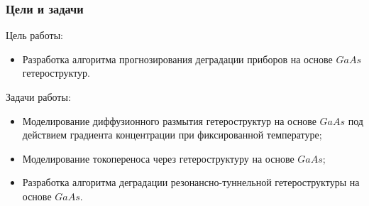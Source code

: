 \documentclass[10pt,pdf,hyperref={unicode},aspectratio={169}]{beamer}
\begin{document}
\begin{frame}
	\frametitle{Цели и задачи}
	\color{blue}
	Цель работы:
	\begin{itemize}
		\item Разработка алгоритма прогнозирования деградации приборов на основе $GaAs$ гетероструктур.
	\end{itemize}
	Задачи работы:
	\begin{itemize}
		\item Моделирование диффузионного размытия гетероструктур на основе $GaAs$ под действием градиента концентрации при фиксированной температуре;
		\item Моделирование токопереноса через гетероструктуру на основе $GaAs$;
		\item Разработка алгоритма деградации резонансно-туннельной гетероструктуры на основе $GaAs$.
	\end{itemize}
\end{frame}
\end{document}
